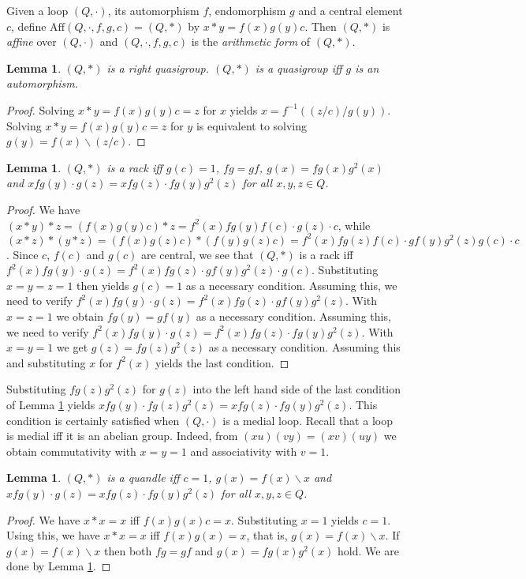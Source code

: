 \documentclass{amsart}
\def\ldiv{\backslash}
\theoremstyle{plain}
\newtheorem{lemma}[theorem]{Lemma}
\theoremstyle{definition}
\begin{document}
Given a loop $(Q,\cdot)$, its automorphism $f$, endomorphism $g$ and a central element $c$, define $\mathrm{Aff}(Q,\cdot,f,g,c)=(Q,*)$ by $x*y = f(x)g(y)c$. Then $(Q,*)$ is \emph{affine} over $(Q,\cdot)$ and $(Q,\cdot,f,g,c)$ is the \emph{arithmetic form} of $(Q,*)$.

\begin{lemma}
$(Q,*)$ is a right quasigroup. $(Q,*)$ is a quasigroup iff $g$ is an automorphism.
\end{lemma}
\begin{proof}
Solving $x*y = f(x)g(y)c=z$ for $x$ yields $x = f^{-1}((z/c)/g(y))$. Solving $x*y=f(x)g(y)c=z$ for $y$ is equivalent to solving $g(y) = f(x)\ldiv (z/c)$.
\end{proof}

\begin{lemma}\label{Lm:AffineRack}
$(Q,*)$ is a rack iff $g(c)=1$, $fg=gf$, $g(x)=fg(x)g^2(x)$ and $xfg(y)\cdot g(z) = xfg(z)\cdot fg(y)g^2(z)$ for all $x,y,z\in Q$.
\end{lemma}
\begin{proof}
We have $(x*y)*z = (f(x)g(y)c)*z = f^2(x)fg(y)f(c)\cdot g(z)\cdot c$, while $(x*z)*(y*z) = (f(x)g(z)c)*(f(y)g(z)c) = f^2(x)fg(z)f(c)\cdot gf(y)g^2(z)g(c)\cdot c$. Since $c$, $f(c)$ and $g(c)$ are central, we see that $(Q,*)$ is a rack iff $f^2(x)fg(y)\cdot g(z) = f^2(x)fg(z)\cdot gf(y)g^2(z)\cdot g(c)$. Substituting $x=y=z=1$ then yields $g(c)=1$ as a necessary condition. Assuming this, we need to verify $f^2(x)fg(y)\cdot g(z) = f^2(x)fg(z)\cdot gf(y)g^2(z)$. With $x=z=1$ we obtain $fg(y) = gf(y)$ as a necessary condition. Assuming this, we need to verify $f^2(x)fg(y)\cdot g(z) = f^2(x)fg(z)\cdot fg(y)g^2(z)$. With $x=y=1$ we get $g(z)=fg(z)g^2(z)$ as a necessary condition. Assuming this and substituting $x$ for $f^2(x)$ yields the last condition.
\end{proof}

Substituting $fg(z)g^2(z)$ for $g(z)$ into the left hand side of the last condition of Lemma \ref{Lm:AffineRack} yields $xfg(y)\cdot fg(z)g^2(z) = xfg(z)\cdot fg(y)g^2(z)$. This condition is certainly satisfied when $(Q,\cdot)$ is a medial loop. Recall that a loop is medial iff it is an abelian group. Indeed, from $(xu)(vy)= (xv)(uy)$ we obtain commutativity with $x=y=1$ and associativity with $v=1$.

\begin{lemma}\label{Lm:AffineQuandle}
$(Q,*)$ is a quandle iff $c=1$, $g(x)=f(x)\ldiv x$ and $xfg(y)\cdot g(z) = xfg(z)\cdot fg(y)g^2(z)$ for all $x,y,z\in Q$.
\end{lemma}
\begin{proof}
We have $x*x=x$ iff $f(x)g(x)c=x$. Substituting $x=1$ yields $c=1$. Using this, we have $x*x=x$ iff $f(x)g(x)=x$, that is, $g(x)=f(x)\ldiv x$. If $g(x)=f(x)\ldiv x$ then both $fg=gf$ and $g(x)=fg(x)g^2(x)$ hold. We are done by Lemma \ref{Lm:AffineRack}.
\end{proof}
\end{document}
